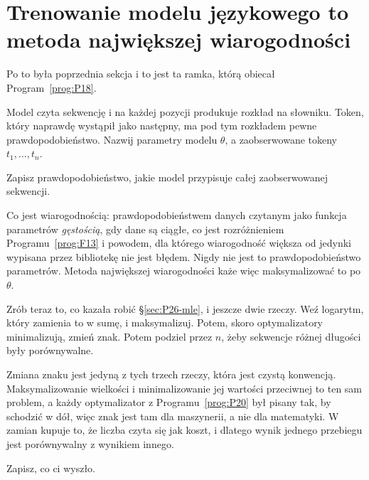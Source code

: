 \section{Trenowanie modelu językowego to metoda największej wiarogodności}
\label{sec:P26-training}

\begin{fr}
Po to była poprzednia sekcja i to jest ta ramka, którą obiecał
Program~\ref{prog:P18}.

Model czyta sekwencję i na każdej pozycji produkuje rozkład na słowniku.
Token, który naprawdę wystąpił jako następny, ma pod tym rozkładem pewne
prawdopodobieństwo. Nazwij parametry modelu $\theta$, a zaobserwowane tokeny
$t_1, \dots, t_n$.

Zapisz prawdopodobieństwo, jakie model przypisuje całej zaobserwowanej
sekwencji.
\dotline
\nextframe
\end{fr}

\begin{fr}

Co jest wiarogodnością: prawdopodobieństwem danych czytanym jako funkcja
parametrów \dash{} \emph{gęstością}, gdy dane są ciągłe, co jest
rozróżnieniem Programu~\ref{prog:F13} i powodem, dla którego wiarogodność
większa od jedynki wypisana przez bibliotekę nie jest błędem. Nigdy nie jest
to prawdopodobieństwo parametrów. Metoda największej wiarogodności każe więc
maksymalizować to po $\theta$.

Zrób teraz to, co kazała robić \S\ref{sec:P26-mle}, i jeszcze dwie rzeczy.
Weź logarytm, który zamienia to w sumę, i maksymalizuj. Potem, skoro
optymalizatory minimalizują, zmień znak. Potem podziel przez $n$, żeby
sekwencje różnej długości były porównywalne.

Zmiana znaku jest jedyną z tych trzech rzeczy, która jest czystą konwencją.
Maksymalizowanie wielkości i minimalizowanie jej wartości przeciwnej to ten
sam problem, a każdy optymalizator z Programu~\ref{prog:P20} był pisany tak,
by schodzić w dół, więc znak jest tam dla maszynerii, a nie dla matematyki. W
zamian kupuje to, że liczba czyta się jak koszt, i dlatego wynik jednego
przebiegu jest porównywalny z wynikiem innego.

Zapisz, co ci wyszło.
\dotline
\nextframe
\end{fr}

